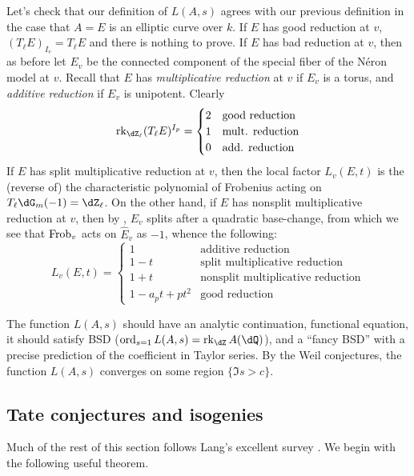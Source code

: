 Let's check that our definition of $L(A,s)$ agrees with our previous definition 
in the case that $A=E$ is an elliptic curve over $k$. If $E$ has good reduction 
at $v$, $(T_\ell E)_{I_v}=T_\ell E$ and there is nothing to prove. If $E$ has 
bad reduction at $v$, then as before let $E_v$ be the connected component 
of the special fiber of the N\'eron model at $v$. Recall that $E$ has 
\emph{multiplicative reduction} at $v$ if $E_v$ is a torus, and \emph{additive 
reduction} if $E_v$ is unipotent. Clearly  
\[
  \rank_{\dZ_\ell} (T_\ell E)^{I_p}
  =
  \begin{cases}
    2 & \text{good reduction} \\
    1 & \text{mult. reduction} \\
    0 & \text{add. reduction}
  \end{cases}
\]
If $E$ has split multiplicative reduction at $v$, then the local factor 
$L_v(E,t)$ is the (reverse of) the characteristic polynomial of Frobenius 
acting on $T_\ell \dG_m(-1) = \dZ_\ell$. On the other hand, if $E$ has 
nonsplit multiplicative reduction at $v$, then by \cite[III,2.5]{si06}, 
$E_v$ splits after a quadratic base-change, from which we see that 
$\mathrm{Frob}_v$ acts on $\widehat E_v$ as $-1$, whence the following: 
\[
  L_v(E,t) = 
    \begin{cases}
      1 & \text{additive reduction} \\
      1-t & \text{split multiplicative reduction} \\
      1+t & \text{nonsplit multiplicative reduction} \\
      1 - a_p t + p t^2 & \text{good reduction} 
    \end{cases}
\]

The function $L(A,s)$ should have an analytic continuation, functional equation, 
it should satisfy BSD ($\ord_{s=1} L(A,s) = \rank_\dZ A(\dQ)$), and a ``fancy BSD'' 
with a precise prediction of the coefficient in Taylor series. 
By the Weil conjectures, the function $L(A,s)$ converges on some region 
$\{\Im s>c\}$. 





\subsection{Tate conjectures and isogenies}

Much of the rest of this section follows Lang's excellent survey 
\cite{la91}. We begin with the following useful theorem.

